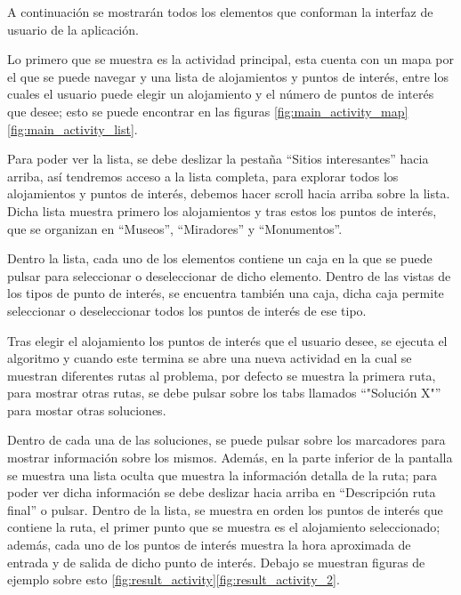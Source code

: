 A continuación se mostrarán todos los elementos que conforman la interfaz de usuario de la aplicación.\newline

Lo primero que se muestra es la actividad principal, esta cuenta con un mapa por el que se puede navegar y una lista de alojamientos y puntos de interés, entre los cuales el usuario puede elegir un alojamiento y el número de puntos de interés que desee; esto se puede encontrar en las figuras \ref{fig:main_activity_map}\ref{fig:main_activity_list}.\newline

Para poder ver la lista, se debe deslizar la pestaña \enquote{Sitios interesantes} hacia arriba, así tendremos acceso a la lista completa, para explorar todos los alojamientos y puntos de interés, debemos hacer scroll hacia arriba sobre la lista. Dicha lista muestra primero los alojamientos y tras estos los puntos de interés, que se organizan en \enquote{Museos}, \enquote{Miradores} y \enquote{Monumentos}.\newline

Dentro la lista, cada uno de los elementos contiene un caja en la que se puede pulsar para seleccionar o deseleccionar de dicho elemento. Dentro de las vistas de los tipos de punto de interés, se encuentra también una caja, dicha caja permite seleccionar o deseleccionar todos los puntos de interés de ese tipo.\newline

Tras elegir el alojamiento los puntos de interés que el usuario desee, se ejecuta el algoritmo y cuando este termina se abre una nueva actividad en la cual se muestran diferentes rutas al problema, por defecto se muestra la primera ruta, para mostrar otras rutas, se debe pulsar sobre los tabs llamados \enquote{"Solución X"} para mostar otras soluciones.\newline

Dentro de cada una de las soluciones, se puede pulsar sobre los marcadores para mostrar información sobre los mismos. Además, en la parte inferior de la pantalla se muestra una lista oculta que muestra la información detalla de la ruta; para poder ver dicha información se debe deslizar hacia arriba en \enquote{Descripción ruta final} o pulsar. Dentro de la lista, se muestra en orden los puntos de interés que contiene la ruta, el primer punto que se muestra es el alojamiento seleccionado; además, cada uno de los puntos de interés muestra la hora aproximada de entrada y de salida de dicho punto de interés. Debajo se muestran figuras de ejemplo sobre esto \ref{fig:result_activity}\ref{fig:result_activity_2}.


